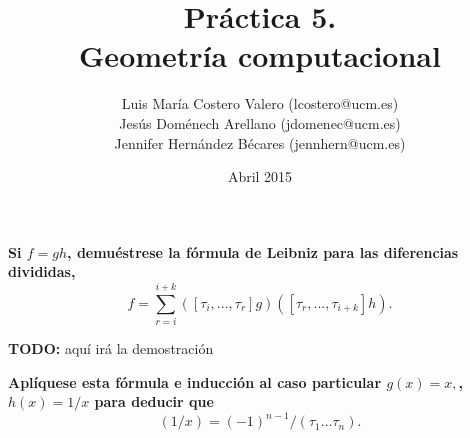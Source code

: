 \documentclass[12pt,a4paper]{article}
\title{Práctica 5. \\ Geometría computacional}
\author{Luis María Costero Valero (lcostero@ucm.es)\\ Jesús Doménech
  Arellano (jdomenec@ucm.es) \\ Jennifer Hernández Bécares (jennhern@ucm.es)}
\date{Abril 2015}
\newcommand{\todo}[1]{{\large \color{red} \textbf{TODO: }#1 }}
\begin{document}
\maketitle

\textbf{Si $f=gh$, demuéstrese la fórmula de Leibniz para las diferencias divididas,}
\begin{equation*}
  [\tau_i,...,\tau_{i+k}]f=\sum_{r=i}^{i+k}([\tau_i,...,\tau_r]g)([\tau_r,...,\tau_{i+k}]h).
\end{equation*}

\todo{aquí irá la demostración}

\textbf{Aplíquese esta fórmula e inducción al caso particular $g(x)=x,$, $h(x)=1/x$ para deducir que}
\begin{equation*}
  [\tau_1,...,\tau_n](1/x)=(-1)^{n-1}/(\tau_1...\tau_n).
\end{equation*}
\end{document}
